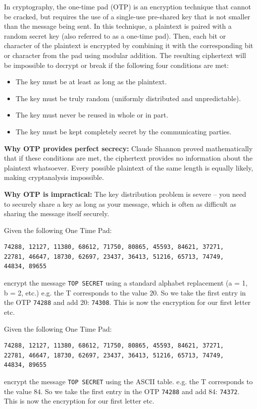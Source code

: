 \documentclass[11pt,a4paper]{report}
\begin{document}
In cryptography, the one-time pad (OTP) is an encryption technique that cannot be cracked, but requires the use of a single-use pre-shared key that is not smaller than the message being sent.
In this technique, a plaintext is paired with a random secret key (also referred to as a one-time pad).
Then, each bit or character of the plaintext is encrypted by combining it with the corresponding bit or character from the pad using modular addition.
The resulting ciphertext will be impossible to decrypt or break if the following four conditions are met:
\begin{itemize}
\item The key must be at least as long as the plaintext.
\item The key must be truly random (uniformly distributed and unpredictable).
\item The key must never be reused in whole or in part.
\item The key must be kept completely secret by the communicating parties.
\end{itemize}

\textbf{Why OTP provides perfect secrecy:} Claude Shannon proved mathematically that if these conditions are met, the ciphertext provides no information about the plaintext whatsoever. Every possible plaintext of the same length is equally likely, making cryptanalysis impossible.

\textbf{Why OTP is impractical:} The key distribution problem is severe -- you need to securely share a key as long as your message, which is often as difficult as sharing the message itself securely.

\begin{ex}
Given the following One Time Pad: 
\begin{verbatim}
74288, 12127, 11380, 68612, 71750, 80865, 45593, 84621, 37271,
22781, 46647, 18730, 62697, 23437, 36413, 51216, 65713, 74749,
44834, 89655
\end{verbatim}
encrypt the message \verb|TOP SECRET|
using a standard alphabet replacement (a = 1, b = 2, etc.) e.g. the T corresponds to the value $20$.
So we take the first entry in the OTP \verb|74288| and add 20: \verb|74308|.
This is now the encryption for our first letter etc.
\end{ex}


\begin{ex}
Given the following One Time Pad: 
\begin{verbatim}
74288, 12127, 11380, 68612, 71750, 80865, 45593, 84621, 37271,
22781, 46647, 18730, 62697, 23437, 36413, 51216, 65713, 74749,
44834, 89655
\end{verbatim}
encrypt the message \verb|TOP SECRET|
using the ASCII table. e.g. the T corresponds to the value $84$.
So we take the first entry in the OTP \verb|74288| and add 84: \verb|74372|.
This is now the encryption for our first letter etc.
\end{ex}
\end{document}
